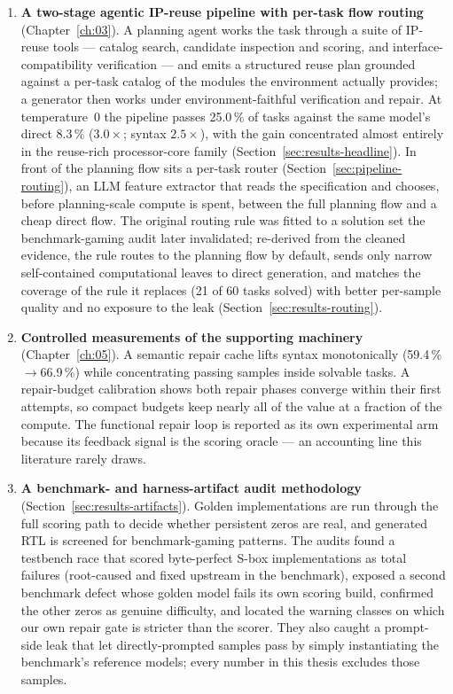 \begin{enumerate}
  \item \textbf{A two-stage agentic IP-reuse pipeline with per-task
    flow routing} (Chapter~\ref{ch:03}). A planning agent works the
    task through a suite of IP-reuse tools --- catalog search,
    candidate inspection and scoring, and interface-compatibility
    verification --- and emits a structured reuse plan grounded
    against a per-task catalog of the modules the environment actually
    provides; a generator then works under environment-faithful
    verification and repair. At temperature~0 the pipeline passes
    25.0\,\% of tasks against the same model's direct 8.3\,\%
    ($3.0\times$; syntax $2.5\times$), with the gain concentrated
    almost entirely in the reuse-rich processor-core family
    (Section~\ref{sec:results-headline}). In front of the planning flow
    sits a per-task router (Section~\ref{sec:pipeline-routing}), an
    LLM feature extractor that reads the specification and chooses,
    before planning-scale compute is spent, between the full planning flow
    and a cheap direct flow. The original routing rule was fitted to a
    solution set the benchmark-gaming audit later invalidated;
    re-derived from the cleaned evidence, the rule routes to the
    planning flow by default, sends only narrow self-contained
    computational leaves to direct generation, and matches the
    coverage of the rule it replaces (21 of 60 tasks solved) with better
    per-sample quality and no exposure to the leak
    (Section~\ref{sec:results-routing}).
  \item \textbf{Controlled measurements of the supporting machinery}
    (Chapter~\ref{ch:05}). A semantic repair cache lifts syntax
    monotonically (59.4\,\%$\to$66.9\,\%) while concentrating passing
    samples inside solvable tasks. A repair-budget calibration shows
    both repair phases converge within their first attempts, so compact
    budgets keep nearly all of the value at a fraction of the
    compute. The functional repair loop is reported as its own
    experimental arm because its feedback signal is the scoring oracle
    --- an accounting line this literature rarely draws.
  \item \textbf{A benchmark- and harness-artifact audit methodology}
    (Section~\ref{sec:results-artifacts}). Golden implementations are
    run through the full scoring path to decide whether persistent
    zeros are real, and generated RTL is screened for benchmark-gaming
    patterns. The audits found a testbench race that scored
    byte-perfect S-box implementations as total failures (root-caused
    and fixed upstream in the benchmark), exposed a second benchmark
    defect whose golden model fails its own scoring build, confirmed
    the other zeros as genuine difficulty, and located the warning
    classes on which our own repair gate is stricter than the
    scorer. They also caught a prompt-side leak that let
    directly-prompted samples pass by simply instantiating the
    benchmark's reference models; every number in this thesis excludes
    those samples.
\end{enumerate}

